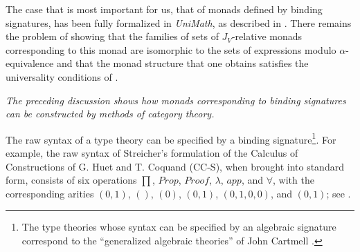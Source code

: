 \documentclass[onecolumn,12pt]{amsart}
\numberwithin{proposition}{subsection}
\begin{document}
The case that is most important for us, that of monads defined by
binding signatures, has been fully formalized in {\em UniMath}, as described
in \cite[{\tt BindingSigToMonad}]{AMM2016}. There remains the
problem of showing that the families of sets of $J_V$-relative monads
corresponding to this monad are isomorphic to the sets of expressions modulo
$\alpha$-equivalence and that the monad structure that one obtains
satisfies the universality conditions of \cite{HM2012}.


{\em The preceding discussion shows how monads corresponding to binding
  signatures can be constructed by methods of category theory.}

The raw syntax of a type theory can be specified by a binding
signature\footnote{The type theories whose syntax can be specified by an
  algebraic signature correspond to the ``generalized algebraic theories'' of
  John Cartmell \cite{Cartmell1,Cartmell0,Garner}.}.  For
example, the raw syntax of Streicher's formulation of the Calculus of
Constructions of G. Huet and T. Coquand (CC-S), when brought into standard
form, consists of six operations $\prod$, $Prop$, $Proof$, $\lambda$, $app$, and
$\forall$, with the corresponding arities $(0,1)$, $()$, $(0)$, $(0,1)$,
$(0,1,0,0)$, and $(0,1)$; see \cite[p.~157]{Streicher}.
\end{document}

